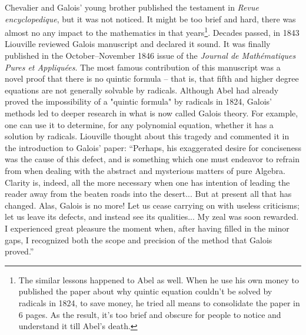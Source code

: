 \documentclass{article}
\begin{document}
Chevalier and Galois' young brother published the testament in {\em Revue encyclopedique}, but it was not noticed. It might be too brief and hard, there was almost no any impact to the mathematics in that years\footnote{The similar lessons happened to Abel as well. When he use his own money to published the paper about why quintic equation couldn't be solved by radicals in 1824, to save money, he tried all means to consolidate the paper in 6 pages. As the result, it's too brief and obscure for people to notice and understand it till Abel's death.}. Decades passed, in 1843 Liouville reviewed Galois manuscript and declared it sound. It was finally published in the October–November 1846 issue of the {\em Journal de Mathématiques Pures et Appliquées}. The most famous contribution of this manuscript was a novel proof that there is no quintic formula – that is, that fifth and higher degree equations are not generally solvable by radicals. Although Abel had already proved the impossibility of a "quintic formula" by radicals in 1824, Galois' methods led to deeper research in what is now called Galois theory. For example, one can use it to determine, for any polynomial equation, whether it has a solution by radicals. Liouville thought about this tragedy and commented it in the introduction to Galois' paper: ``Perhaps, his exaggerated desire for conciseness was the cause of this defect, and is something which one must endeavor to refrain from when dealing with the abstract and mysterious matters of pure Algebra. Clarity is, indeed, all the more necessary when one has intention of leading the reader away from the beaten roads into the desert... But at present all that has changed. Alas, Galois is no more! Let us cease carrying on with useless criticisms; let us leave its defects, and instead see its qualities... My zeal was soon rewarded. I experienced great pleasure the moment when, after having filled in the minor gaps, I recognized both the scope and precision of the method that Galois proved.''\cite{Liouville-1846}
\end{document}
